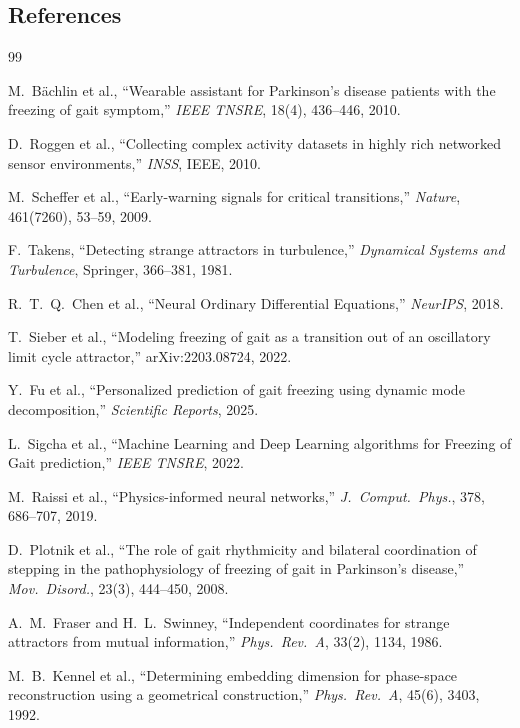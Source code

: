 \documentclass[12pt,a4paper]{article}
\begin{document}
\subsection*{References}

\begin{thebibliography}{99}
\small

M.~B\"{a}chlin et al., ``Wearable assistant for Parkinson's disease patients with the freezing
of gait symptom,'' \textit{IEEE TNSRE}, 18(4), 436--446, 2010.

D.~Roggen et al., ``Collecting complex activity datasets in highly rich networked sensor
environments,'' \textit{INSS}, IEEE, 2010.

M.~Scheffer et al., ``Early-warning signals for critical transitions,'' \textit{Nature},
461(7260), 53--59, 2009.

F.~Takens, ``Detecting strange attractors in turbulence,'' \textit{Dynamical Systems and
Turbulence}, Springer, 366--381, 1981.

R.~T.~Q.~Chen et al., ``Neural Ordinary Differential Equations,'' \textit{NeurIPS}, 2018.

T.~Sieber et al., ``Modeling freezing of gait as a transition out of an oscillatory limit cycle
attractor,'' arXiv:2203.08724, 2022.

Y.~Fu et al., ``Personalized prediction of gait freezing using dynamic mode decomposition,''
\textit{Scientific Reports}, 2025.

L.~Sigcha et al., ``Machine Learning and Deep Learning algorithms for Freezing of Gait
prediction,'' \textit{IEEE TNSRE}, 2022.

M.~Raissi et al., ``Physics-informed neural networks,'' \textit{J.\ Comput.\ Phys.}, 378,
686--707, 2019.

D.~Plotnik et al., ``The role of gait rhythmicity and bilateral coordination of stepping in the
pathophysiology of freezing of gait in Parkinson's disease,'' \textit{Mov.\ Disord.}, 23(3),
444--450, 2008.

A.~M.~Fraser and H.~L.~Swinney, ``Independent coordinates for strange attractors from mutual
information,'' \textit{Phys.\ Rev.\ A}, 33(2), 1134, 1986.

M.~B.~Kennel et al., ``Determining embedding dimension for phase-space reconstruction using a
geometrical construction,'' \textit{Phys.\ Rev.\ A}, 45(6), 3403, 1992.


\end{thebibliography}
\end{document}
